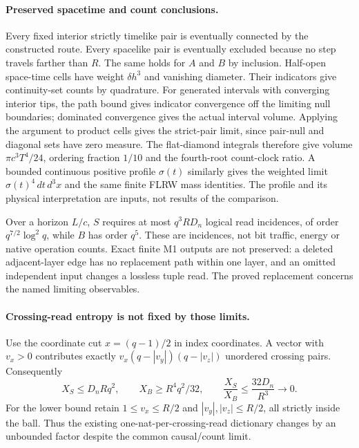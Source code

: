 \paragraph{Preserved spacetime and count conclusions.}
Every fixed interior strictly timelike pair is eventually connected by the
constructed route. Every spacelike pair is eventually excluded because no
step travels farther than $R$. The same holds for $A$ and $B$ by inclusion.
Half-open space-time cells have weight $\delta h^3$ and vanishing diameter.
Their indicators give continuity-set counts by quadrature. For generated
intervals with converging interior tips, the path bound gives indicator
convergence off the limiting null boundaries; dominated convergence gives
the actual interval volume. Applying the argument to product cells gives
the strict-pair limit, since pair-null and diagonal sets have zero measure.
The flat-diamond integrals therefore give volume
$\pi c^3T^4/24$, ordering fraction $1/10$ and the fourth-root count-clock
ratio. A bounded continuous positive profile $\sigma(t)$ similarly gives
the weighted limit $\sigma(t)^4\,dt\,d^3x$ and the same finite FLRW mass
identities. The profile and its physical interpretation are inputs, not results of the comparison.

Over a horizon $L/c$, $S$ requires at most $q^3RD_n$ logical read incidences,
of order $q^{7/2}\log^2q$, while $B$ has order $q^5$. These are incidences,
not bit traffic, energy or native operation counts. Exact finite M1 outputs
are not preserved: a deleted adjacent-layer edge has no replacement path
within one layer, and an omitted independent input changes a lossless tuple
read. The proved replacement concerns the named limiting observables.

\paragraph{Crossing-read entropy is not fixed by those limits.}
Use the coordinate cut $x=(q-1)/2$ in index coordinates. A vector with $v_x>0$
contributes exactly
$v_x(q-|v_y|)(q-|v_z|)$ unordered crossing pairs. Consequently
\[
 X_S\le D_nRq^2,\qquad X_B\ge R^4q^2/32,
 \qquad \frac{X_S}{X_B}\le\frac{32D_n}{R^3}\longrightarrow0.
\]
For the lower bound retain $1\le v_x\le R/2$ and
$|v_y|,|v_z|\le R/2$, all strictly inside the ball. Thus the existing
one-nat-per-crossing-read dictionary changes by an unbounded factor despite
the common causal/count limit.

